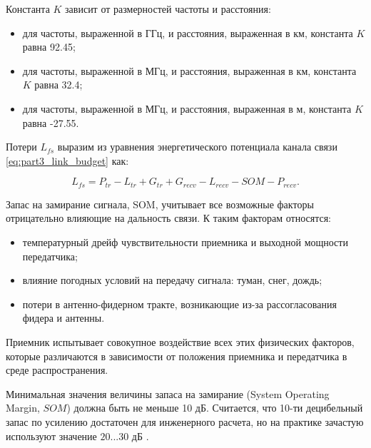 Константа $K$ зависит от размерностей частоты и расстояния:

\begin{itemize}
  \item для частоты, выраженной в ГГц, и расстояния, выраженная в км, константа $K$ равна 92.45;
  \item для частоты, выраженной в МГц, и расстояния, выраженная в км, константа $K$ равна 32.4;
  \item для частоты, выраженной в МГц, и расстояния, выраженная в м, константа $K$ равна -27.55.
\end{itemize} 

Потери $L_{fs}$ выразим из уравнения энергетического потенциала канала связи \cref{eq:part3_link_budget} как:

\begin{equation}
  \label{eq:part3_L_fs_from_link_budget}
  L_{fs} = P_{tr} - L_{tr} + G_{tr} + G_{recv} - L_{recv} - SOM - P_{recv}.
\end{equation}


Запас на замирание сигнала, SOM,  учитывает все возможные факторы отрицательно влияющие на дальность связи. К таким факторам относятся:

\begin{itemize}
  \item температурный дрейф чувствительности приемника и выходной мощности передатчика;
  \item влияние погодных условий на передачу сигнала: туман, снег, дождь;
  \item  потери в антенно-фидерном тракте, возникающие из-за рассогласования фидера и антенны.
\end{itemize}
Приемник испытывает совокупное воздействие всех этих физических факторов, которые различаются в зависимости от положения приемника и передатчика в среде распространения. 

Минимальная значения величины запаса на замирание  (System Operating Margin, $SOM$) должна быть не меньше  10 дБ. Считается, что 10-ти децибельный запас по усилению достаточен для инженерного расчета, но на практике зачастую используют значение $20 ... 30$ дБ \cite{Proletarsky}.








